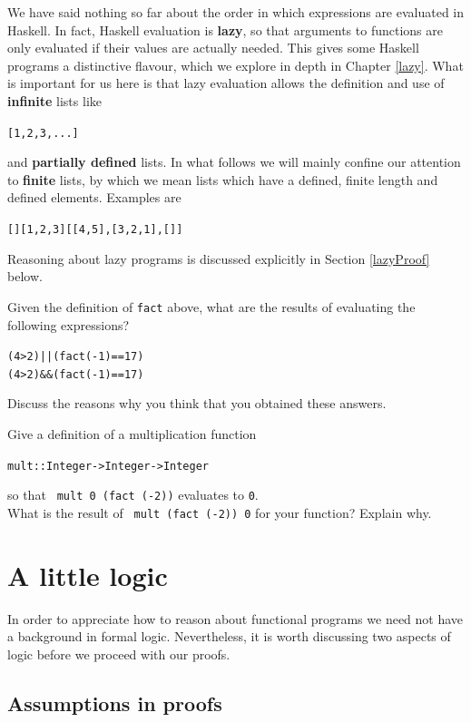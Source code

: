 We have said nothing so far about the order in which expressions are
evaluated in Haskell. In fact, Haskell evaluation is \textbf{lazy}, so
that arguments to functions are only evaluated if their values are
actually needed. This gives some Haskell programs a
distinctive flavour, which we explore in depth in Chapter \ref{lazy}.
What is important for us here is that lazy evaluation allows the
definition and use of \textbf{infinite} lists like
\begin{alltt}
[1,2,3, ... ]
\end{alltt}
and \textbf{partially defined}
lists. In what follows we will
mainly confine our attention to \textbf{finite} lists, by which we mean
lists which have a defined, finite length and defined elements.
Examples are
\begin{alltt}
[]             [1,2,3]             [[4,5],[3,2,1],[]]
\end{alltt}
Reasoning about lazy programs is discussed explicitly
in Section \ref{lazyProof} below.

\begin{exercises}
\item
Given the definition of \texttt{fact} above, what are the results of
evaluating the following expressions?
\begin{alltt}
(4 > 2) || (fact (-1) == 17)
(4 > 2) \&\& (fact (-1) == 17)
\end{alltt}
Discuss the reasons why you think that you obtained these answers.

\item
Give a definition of a multiplication function
\begin{alltt}
mult :: Integer -> Integer -> Integer
\end{alltt}
so that \texttt{\ mult 0 (fact (-2))} evaluates to \texttt{0}.\\
What is the result of \texttt{\ mult (fact (-2)) 0} for your function?
Explain why.
\end{exercises}
\section{A little logic}

In order to appreciate how to reason about functional programs we
need not have a background in formal logic. Nevertheless, it is worth
discussing two aspects of logic before we proceed with our proofs.

\subsection*{Assumptions in proofs}

